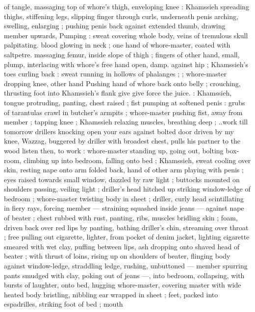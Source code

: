 of tangle, massaging top of whore's thigh, enveloping knee : 
Khamssieh spreading thighs, stiffening legs, slipping finger through 
curls, underneath penis arching, swelling, enlarging ; pushing penis 
back against extended thumb, drawing member upwards, Pumping : 
sweat covering whole body, veins of tremulous skull palpitating. 
blood glowing in neck ; one hand of whore-master, coated with 
saltpetre. massaging femur, inside slope of thigh ; fingers of other 
hand, small, plump, interlacing with whore's free hand open, damp. 
against hip ; Khamssieh's toes curling back : sweat running in 
hollows of phalanges ; ; whore-master dropping knee, other hand 
Pushing hand of whore back onto belly ; crouching, thrusting foot 
into Khamssieh's flank{\thd} {\gl} give{\thd} give{\thd} force the juice. {\gr} : 
Khamssieh, tongue protruding, panting, chest raised ; fist pumping 
at softened penis{\td} : {\gl}{\td} grubs of tarantulas crawl in butcher's 
armpits{\td} {\gr} ; whore-master pushing fist, away from member ; tapping 
knee ; Khamssieh relaxing muscles, breathing deep ; {\gl}..work till 
tomorrow{\thd} drillers knocking{\thd} open your ears against bolted door{\thd} 
driven by my knee, Wazzag, buggered by driller with broadest chest, 
pulls his partner to the wood{\thd} listen then, to work{\thd}{\gr} : whore-master 
standing up, going out, bolting box-room, climbing up into bedroom, 
falling onto bed ; Khamssieh, sweat cooling over skin, resting nape 
onto arm folded back, hand of other arm playing with penis ; eyes 
raised towards small window, dazzled by raw light ; buttocks mounted 
on shoulders passing, veiling light ; driller's head hitched up striking 
window-ledge of bedroom ; whore-master twisting body in sheet ; 
driller, curly head scintillating in fiery rays, forcing member --- 
straining squashed inside jeans --- against nape of beater ; chest 
rubbed with rust, panting, ribs, muscles bridling skin ; foam, driven 
back over red lips by panting, bathing driller's chin, streaming over 
throat ; free pulling out cigarette, lighter, from pocket of denim 
jacket, lighting cigarette smeared with wet clay, puffing between lips, 
ash dropping onto shaved head of beater ; with thrust of loins, rising 
up on shoulders of beater, flinging body against window-ledge, 
straddling ledge, rushing, unbuttoned --- member spurring pants 
smudged with clay, poking out of jeans ---, into bedroom, collapsing, 
with bursts of laughter, onto bed, hugging whore-master, covering 
master with wide heated body bristling, nibbling ear wrapped in sheet 
; feet, packed into espadrilles, striking foot of bed ; mouth 
